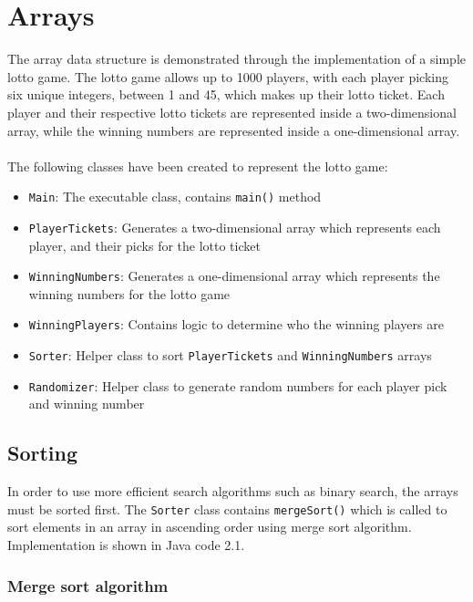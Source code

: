 \newpage
\section{Arrays}

The array data structure is demonstrated through the implementation of a simple lotto game. The lotto game allows up to 1000 players, with each player picking six unique integers, between 1 and 45, which makes up their lotto ticket. Each player and their respective lotto tickets are represented inside a two-dimensional array, while the winning numbers are represented inside a one-dimensional array.
\\
\\
The following classes have been created to represent the lotto game:

\begin{itemize}
\item \texttt{Main}: The executable class, contains \texttt{main()} method
\item \texttt{PlayerTickets}: Generates a two-dimensional array which represents each player, and their picks for the lotto ticket
\item \texttt{WinningNumbers}: Generates a one-dimensional array which represents the winning numbers for the lotto game
\item \texttt{WinningPlayers}: Contains logic to determine who the winning players are
\item \texttt{Sorter}: Helper class to sort \texttt{PlayerTickets} and \texttt{WinningNumbers} arrays
\item \texttt{Randomizer}: Helper class to generate random numbers for each player pick and winning number
\end{itemize}

\subsection{Sorting}

In order to use more efficient search algorithms such as binary search, the arrays must be sorted first. The \texttt{Sorter} class contains \texttt{mergeSort()} which is called to sort elements in an array in ascending order using merge sort algorithm. Implementation is shown in Java code 2.1.

\subsubsection{Merge sort algorithm}

